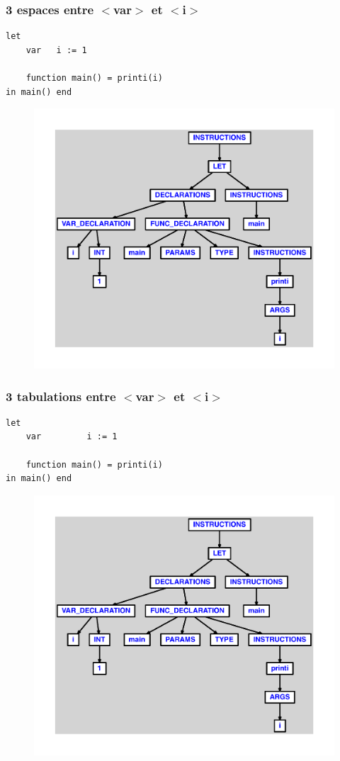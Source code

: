 \documentclass{article}
\begin{document}
\subsubsection{3 espaces entre $ < $var$ > $ et $ < $i$ > $}
\begin{lstlisting}
let
	var   i := 1

	function main() = printi(i)
in main() end
\end{lstlisting}
\newpage
\begin{figure}[H]
\centering
\includegraphics[max width=\textwidth]{ast/ast_189.pdf}
\end{figure}
\newpage
\subsubsection{3 tabulations entre $ < $var$ > $ et $ < $i$ > $}
\begin{lstlisting}
let
	var			i := 1

	function main() = printi(i)
in main() end
\end{lstlisting}
\newpage
\begin{figure}[H]
\centering
\includegraphics[max width=\textwidth]{ast/ast_190.pdf}
\end{figure}
\newpage
\end{document}
